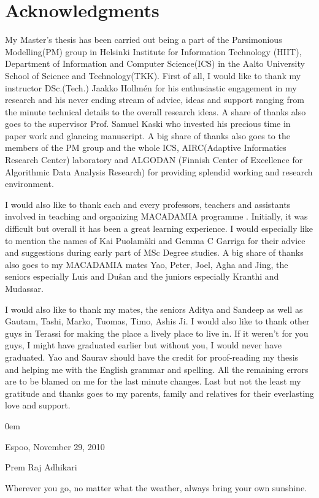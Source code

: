 \chapter*{Acknowledgments}
\label{acknowledgements}
{\footnotesize
My Master’s thesis has been carried out being a part of the Parsimonious Modelling(PM) group in Helsinki Institute for Information Technology (HIIT), Department of Information and Computer Science(ICS) in the Aalto University School of Science and Technology(TKK). First of all, I would like to thank my instructor DSc.(Tech.) Jaakko Hollm{\'e}n for his enthusiastic engagement in my research and his never ending stream of advice, ideas and support ranging from the minute technical details to the overall research ideas. A share of thanks also goes to the supervisor Prof. Samuel Kaski who invested his precious time in paper work and glancing manuscript. A big share of thanks also goes to the members of the PM group and the whole ICS, AIRC(Adaptive Informatics Research Center) laboratory and ALGODAN (Finnish Center of Excellence for Algorithmic Data Analysis Research) for providing splendid working and research environment.

I would also like to thank each and every professors, teachers and assistants involved in teaching and organizing MACADAMIA programme \cite{macadamia}. Initially, it was difficult but overall it has been a great learning experience. I would especially like to mention the names of Kai Puolam\"aki and Gemma C Garriga for their advice and suggestions during early part of MSc Degree studies. A big share of thanks also goes to my MACADAMIA mates Yao, Peter, Joel, Agha and Jing, the seniors especially Luis and Du\^san and the juniors especially Kranthi and Mudassar.

I would also like to thank my mates, the seniors Aditya and Sandeep as well as Gautam, Tashi, Marko, Tuomas, Timo, Ashis Ji. I would also like to thank other guys in Terassi for making the place a lively place to live in. If it weren’t for you guys, I might have graduated earlier but without you, I would never have  graduated. Yao and Saurav should have the credit for proof-reading my thesis and helping me with the English grammar and spelling. All the remaining errors are to be blamed on me for the last minute changes. Last but not the least my gratitude and thanks goes to my parents, family and relatives for their everlasting love and support.}

\parindent 0em
\begin{flushright}
\vskip0.5cm
Espoo, November 29, 2010

Prem Raj Adhikari
\end{flushright}

\clearpage
\thispagestyle{empty}


\vspace{8cm}

\begin{fquote} {\large  Wherever you go, no matter what the weather, always bring your own sunshine.}   \end{fquote} 
